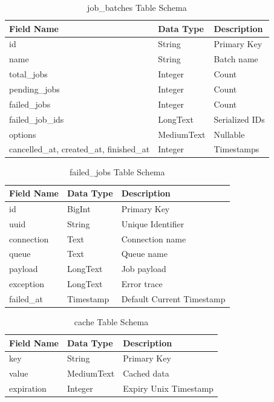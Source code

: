 \begin{longtable}{|l|l|p{7.5cm}|}
\caption{job\_batches Table Schema} \\
\hline
\textbf{Field Name} & \textbf{Data Type} & \textbf{Description} \\ \hline
id & String & Primary Key \\ \hline
name & String & Batch name \\ \hline
total\_jobs & Integer & Count \\ \hline
pending\_jobs & Integer & Count \\ \hline
failed\_jobs & Integer & Count \\ \hline
failed\_job\_ids & LongText & Serialized IDs \\ \hline
options & MediumText & Nullable \\ \hline
cancelled\_at, created\_at, finished\_at & Integer & Timestamps \\ \hline
\end{longtable}

\begin{longtable}{|l|l|p{7.5cm}|}
\caption{failed\_jobs Table Schema} \\
\hline
\textbf{Field Name} & \textbf{Data Type} & \textbf{Description} \\ \hline
id & BigInt & Primary Key \\ \hline
uuid & String & Unique Identifier \\ \hline
connection & Text & Connection name \\ \hline
queue & Text & Queue name \\ \hline
payload & LongText & Job payload \\ \hline
exception & LongText & Error trace \\ \hline
failed\_at & Timestamp & Default Current Timestamp \\ \hline
\end{longtable}

\begin{longtable}{|l|l|p{7.5cm}|}
\caption{cache Table Schema} \\
\hline
\textbf{Field Name} & \textbf{Data Type} & \textbf{Description} \\ \hline
key & String & Primary Key \\ \hline
value & MediumText & Cached data \\ \hline
expiration & Integer & Expiry Unix Timestamp \\ \hline
\end{longtable}

